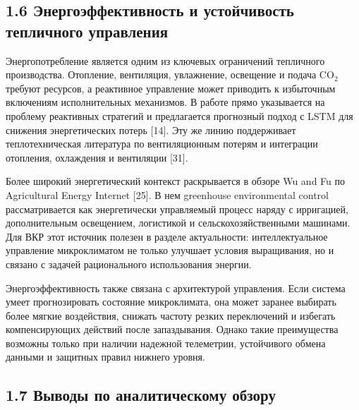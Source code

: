 \documentclass[a4paper,14pt]{extarticle}
\begin{document}
\hypertarget{ux44dux43dux435ux440ux433ux43eux44dux444ux444ux435ux43aux442ux438ux432ux43dux43eux441ux442ux44c-ux438-ux443ux441ux442ux43eux439ux447ux438ux432ux43eux441ux442ux44c-ux442ux435ux43fux43bux438ux447ux43dux43eux433ux43e-ux443ux43fux440ux430ux432ux43bux435ux43dux438ux44f}{%
\subsection{1.6 Энергоэффективность и устойчивость тепличного
управления}\label{ux44dux43dux435ux440ux433ux43eux44dux444ux444ux435ux43aux442ux438ux432ux43dux43eux441ux442ux44c-ux438-ux443ux441ux442ux43eux439ux447ux438ux432ux43eux441ux442ux44c-ux442ux435ux43fux43bux438ux447ux43dux43eux433ux43e-ux443ux43fux440ux430ux432ux43bux435ux43dux438ux44f}}

Энергопотребление является одним из ключевых ограничений тепличного
производства. Отопление, вентиляция, увлажнение, освещение и подача
CO\(_2\) требуют ресурсов, а реактивное управление может приводить к
избыточным включениям исполнительных механизмов. В работе прямо
указывается на проблему реактивных стратегий и предлагается прогнозный
подход с LSTM для снижения энергетических потерь {[}14{]}. Эту же линию
поддерживает теплотехническая литература по вентиляционным потерям и
интеграции отопления, охлаждения и вентиляции {[}31{]}.

Более широкий энергетический контекст раскрывается в обзоре Wu and Fu по
Agricultural Energy Internet {[}25{]}. В нем greenhouse environmental
control рассматривается как энергетически управляемый процесс наряду с
ирригацией, дополнительным освещением, логистикой и
сельскохозяйственными машинами. Для ВКР этот источник полезен в разделе
актуальности: интеллектуальное управление микроклиматом не только
улучшает условия выращивания, но и связано с задачей рационального
использования энергии.

Энергоэффективность также связана с архитектурой управления. Если
система умеет прогнозировать состояние микроклимата, она может заранее
выбирать более мягкие воздействия, снижать частоту резких переключений и
избегать компенсирующих действий после запаздывания. Однако такие
преимущества возможны только при наличии надежной телеметрии,
устойчивого обмена данными и защитных правил нижнего уровня.

\hypertarget{ux432ux44bux432ux43eux434ux44b-ux43fux43e-ux430ux43dux430ux43bux438ux442ux438ux447ux435ux441ux43aux43eux43cux443-ux43eux431ux437ux43eux440ux443}{%
\subsection{1.7 Выводы по аналитическому
обзору}\label{ux432ux44bux432ux43eux434ux44b-ux43fux43e-ux430ux43dux430ux43bux438ux442ux438ux447ux435ux441ux43aux43eux43cux443-ux43eux431ux437ux43eux440ux443}}
\end{document}
